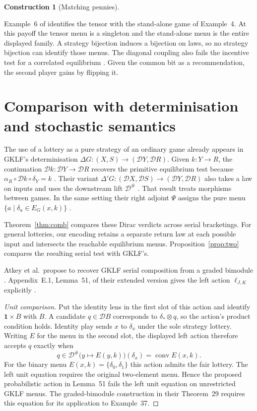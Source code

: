 \documentclass[11pt,a4paper]{article}
\theoremstyle{definition}
\newtheorem*{construction}{Construction}
\newcommand{\D}{\mathcal D}
\newcommand{\conv}{\operatorname{conv}}
\newcommand{\one}{\mathbf 1}
\begin{document}
\begin{construction}[Matching pennies]
\begin{enumerate}[titledsteps]
        Example~6 of \cite{gklf} identifies the tensor with the stand-alone game of Example~4. At this payoff the tensor menu is a singleton and the stand-alone menu is the entire displayed family. A strategy bijection induces a bijection on laws, so no strategy bijection can identify those menus. The diagonal coupling also fails the incentive test for a correlated equilibrium \cite{aumann}. Given the common bit as a recommendation, the second player gains by flipping it.
    \end{enumerate}
\end{construction}

\section{Comparison with determinisation and stochastic semantics}\label{sec:related}

The use of a lottery as a pure strategy of an ordinary game already appears in GKLF's determinisation $\Delta G:(X,S)\to(\D Y,\D R)$. Given $k:Y\to R$, the continuation $\D k:\D Y\to\D R$ recovers the primitive equilibrium test because $\alpha_R\circ\D k\circ\delta_Y=k$ \cite[Definition~7 and Lemma~8]{gklf}. Their variant $\Delta' G:(\D X,\D S)\to(\D Y,\D R)$ also takes a law on inputs and uses the downstream lift $\D^\#$ \cite[Proposition~20]{gklf}. That result treats morphisms between games. In the same setting their right adjoint $\Psi$ assigns the pure menu $\{a\mid\delta_a\in E_G(x,k)\}$ \cite[Theorem~21]{gklf}.

Theorem~\ref{thm:comb} compares these Dirac verdicts across serial bracketings. For general lotteries, our encoding retains a separate return law at each possible input and intersects the reachable equilibrium menus. Proposition~\ref{prop:two} compares the resulting serial test with GKLF's.

Atkey et al.\ propose to recover GKLF serial composition from a graded bimodule \cite[Theorem~29 and Example~37]{atkey}. Appendix~E.1, Lemma~51, of their extended version gives the left action $\ell_{J,K}$ explicitly \cite{atkeyext}.

\begin{proof}[Unit comparison]
    Put the identity lens in the first slot of this action and identify $\one\times B$ with $B$. A candidate $q\in\D B$ corresponds to $\delta_*\otimes q$, so the action's product condition holds. Identity play sends $x$ to $\delta_x$ under the sole strategy lottery. Writing $E$ for the menu in the second slot, the displayed left action therefore accepts $q$ exactly when
    \[
        q\in\D^\#\bigl(y\mapsto E(y,k)\bigr)(\delta_x)
        =\conv E(x,k).
    \]
    For the binary menu $E(x,k)=\{\delta_0,\delta_1\}$ this action admits the fair lottery. The left unit equation requires the original two-element menu. Hence the proposed probabilistic action in Lemma~51 fails the left unit equation on unrestricted GKLF menus. The graded-bimodule construction in their Theorem~29 requires this equation for its application to Example~37.
\end{proof}
\end{document}
